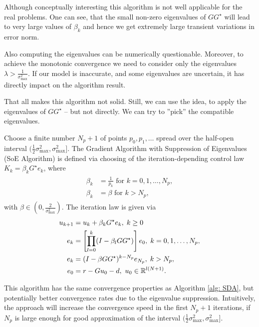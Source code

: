 Although conceptually interesting this algorithm is not well applicable for the real problems. One can see, that the small non-zero eigenvalues of $GG^\star$ will lead to very large values of $\beta_k$ and hence we get extremely large transient variations in error norm. 

Also computing the eigenvalues can be numerically questionable. Moreover, to achieve the monotonic convergence we need to consider only the eigenvalues $\lambda > \frac{1}{\sigma_{\max}^2}$.
If our model is inaccurate, and some eigenvalues are uncertain, it has directly impact on the algorithm result. 

That all makes this algorithm not solid. Still, we can use the idea, to apply the eigenvalues of $G G^{\star}$ -- but not directly. We can try to ''pick'' the compatible eigenvalues.
\begin{alg}
	Choose a finite number $N_p + 1$ of points $p_0, p_1, \dots$ spread over the half-open interval $(\frac{1}{2}\sigma_{\max}^2, \sigma_{\max}^2]$. 
	The Gradient Algorithm with Suppression of Eigenvalues (SoE Algorithm) is defined via choosing of the iteration-depending control law  $K_k = \beta_k G^\star e_k$, where 
	\begin{align}
	\begin{split}
	\beta_k &= \frac{1}{p_k} \text{ for } k = 0 , 1, \dots , N_p,\\
	\beta_k &= \beta  \text{ for } k > N_p,
	\end{split}
	\end{align}
	with $\beta \in (0, \frac{2}{\sigma_{\max}^2})$.
	The iteration law is given via
	\begin{align}
	\begin{split}
	u_{k+1} &= u_k + \beta_k G^\star e_k, \; k\geq 0\\
	e _{k} &= \left[\prod_{l = 0}^k (I - \beta_l  GG^\star) \right] e_{0}, \;  k = 0 , 1, \dots , N_p,\\
	e _{k} &=  (I - \beta GG^\star)^{k - N_p} e_{N_p}, \;  k > N_p, \\
	e_0 &= r -  Gu_0 -d, \text{ } u_0 \in {\mathbb{R}}^{l (N+1)}.
	\end{split}
	\end{align}	
\end{alg}

This algorithm has the same convergence properties as Algorithm \ref{alg: SDA}, but potentially better convergence rates due to the eigenvalue suppression. Intuitively, the approach will increase the convergence speed in the first $N_p + 1$ iterations, if $N_p$ is large enough for good approximation of the interval $(\frac{1}{2} \sigma_{\max}^2, \sigma_{\max}^2]$.

